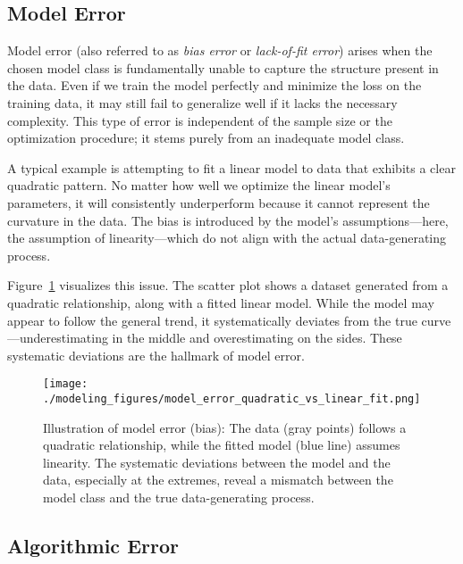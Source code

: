 \documentclass[12pt,openany]{book}
\begin{document}
\subsection{Model Error}  \label{subsec:model_error}

Model error (also referred to as \textit{bias error} or \textit{lack-of-fit error}) arises when the chosen model class is fundamentally unable to capture the structure present in the data. Even if we train the model perfectly and minimize the loss on the training data, it may still fail to generalize well if it lacks the necessary complexity. This type of error is independent of the sample size or the optimization procedure; it stems purely from an inadequate model class. \newline

A typical example is attempting to fit a linear model to data that exhibits a clear quadratic pattern. No matter how well we optimize the linear model's parameters, it will consistently underperform because it cannot represent the curvature in the data. The bias is introduced by the model’s assumptions—here, the assumption of linearity—which do not align with the actual data-generating process. \newline

Figure~\ref{fig:model-error-linear-fit} visualizes this issue. The scatter plot shows a dataset generated from a quadratic relationship, along with a fitted linear model. While the model may appear to follow the general trend, it systematically deviates from the true curve—underestimating in the middle and overestimating on the sides. These systematic deviations are the hallmark of model error.

\begin{figure}[H]
    \centering
    \texttt{[image: ./modeling\_figures/model\_error\_quadratic\_vs\_linear\_fit.png]}
    \caption{
    Illustration of model error (bias): The data (gray points) follows a quadratic relationship, while the fitted model (blue line) assumes linearity. The systematic deviations between the model and the data, especially at the extremes, reveal a mismatch between the model class and the true data-generating process. 
    }
    \label{fig:model-error-linear-fit}
\end{figure}


\subsection{Algorithmic Error}  \label{subsec:algorithmic_error}
\end{document}
